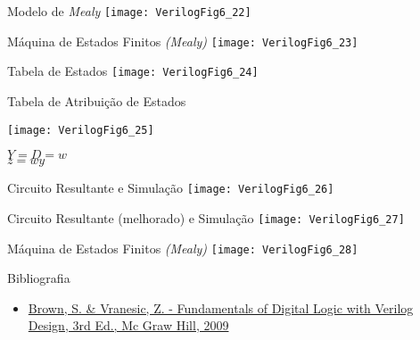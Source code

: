 

\subtitle{Circuitos Sequenciais: Máquinas de Estados Finitos} %



\begin{frame}
	\titlepage
\end{frame} 

\begin{frame}{Modelo de \textit{Mealy}} \centering
    \texttt{[image: VerilogFig6\_22]} 
\end{frame}

\begin{frame}{Máquina de Estados Finitos \textit{(Mealy)}} \centering
    \texttt{[image: VerilogFig6\_23]} 
\end{frame}

\begin{frame}{Tabela de Estados} \centering
    \texttt{[image: VerilogFig6\_24]} 
\end{frame}

\begin{frame}{Tabela de Atribuição de Estados} 
\begin{center}
    \texttt{[image: VerilogFig6\_25]} \\
\end{center}
    $Y = D = w$ \\ 
    $z = wy$ \\ 
\end{frame}

\begin{frame}{Circuito Resultante e Simulação} \centering
    \texttt{[image: VerilogFig6\_26]} 
\end{frame}

\begin{frame}{Circuito Resultante (melhorado) e Simulação} \centering
    \texttt{[image: VerilogFig6\_27]} 
\end{frame}

\begin{frame}{Máquina de Estados Finitos \textit{(Mealy)}} \centering
    \texttt{[image: VerilogFig6\_28]} 
\end{frame}

\begin{frame}{Bibliografia} 
	\begin{itemize}
		\item \href{https://www.google.com.br/search?q=filetype\%3Apdf+Fundamentals+of+Digital+Logic+with+Verilog+Design+&oq=filetype\%3Apdf}{Brown, S. \& Vranesic, Z. - Fundamentals of Digital Logic with Verilog Design, 3rd Ed., Mc Graw Hill, 2009}
	\end{itemize}
\end{frame}

\begin{frame}
	\titlepage
\end{frame} 

